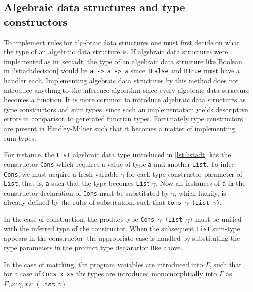 \subsection{Algebraic data structures and type constructors}
To implement rules for algebraic data structures one must first decide on what the type of an algebraic data structure is.
If algebraic data structures were implemented as in \autoref{sec:adt} the type of an algebraic data structure like Boolean in \autoref{lst:adtdecision} would be \texttt{a -> a -> a} since \texttt{BFalse} and \texttt{BTrue} must have a handler each.
Implementing algebraic data structures by this method does not introduce anything to the inference algorithm since every algebraic data structure becomes a function.
It is more common to introduce algebraic data structures as type constructors and sum types, since such an implementation yields descriptive errors in comparison to generated function types.
Fortunately type constructors are present in Hindley-Milner such that it becomes a matter of implementing sum-types.

For instance, the \texttt{List} algebraic data type introduced in \autoref{lst:listadt} has the constructor \texttt{Cons} which requires a value of type \texttt{a} and another \texttt{List}.
To infer \texttt{Cons}, we must acquire a fresh variable $\gamma$ for each type constructor parameter of \texttt{List}, that is, \texttt{a} such that the type becomes \texttt{List} $\gamma$.
Now all instances of \texttt{a} in the constructor declaration of \texttt{Cons} must be substituted by $\gamma$, which luckily, is already defined by the rules of substitution, such that \texttt{Cons $\gamma$ (List $\gamma$)}.

In the case of construction, the product type \texttt{Cons $\gamma$ (List $\gamma$)} must be unified with the inferred type of the constructor.
When the subsequent \texttt{List} sum-type appears in the constructor, the appropriate case is handled by substituting the type parameters in the product type declaration like above.

In the case of matching, the program variables are introduced into $\Gamma$, such that for a case of \texttt{Cons x xs} the types are introduced monomorphically into $\Gamma$ as $\Gamma,x:\gamma,xs:(\texttt{List } \gamma)$.



